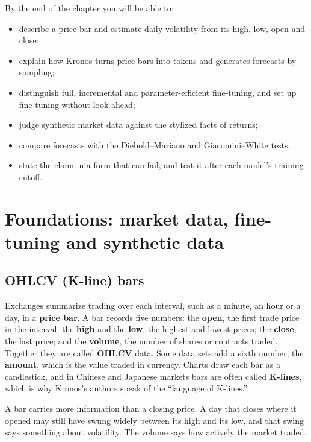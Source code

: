 By the end of the chapter you will be able to:

\begin{itemize}
  \item describe a price bar and estimate daily volatility from its high, low, open and close;
  \item explain how Kronos turns price bars into tokens and generates forecasts by sampling;
  \item distinguish full, incremental and parameter-efficient fine-tuning, and set up fine-tuning without look-ahead;
  \item judge synthetic market data against the stylized facts of returns;
  \item compare forecasts with the Diebold--Mariano and Giacomini--White tests;
  \item state the claim in a form that can fail, and test it after each model's training cutoff.
\end{itemize}

\section{Foundations: market data, fine-tuning and synthetic data}
\label{sec:22-foundations}

\subsection{OHLCV (K-line) bars}

Exchanges summarize trading over each interval, such as a minute, an hour or a day, in a \textbf{price bar}. A bar records five numbers: the \textbf{open}, the first trade price in the interval; the \textbf{high} and the \textbf{low}, the highest and lowest prices; the \textbf{close}, the last price; and the \textbf{volume}, the number of shares or contracts traded. Together they are called \textbf{OHLCV} data. Some data sets add a sixth number, the \textbf{amount}, which is the value traded in currency. Charts draw each bar as a candlestick, and in Chinese and Japanese markets bars are often called \textbf{K-lines}, which is why Kronos's authors speak of the ``language of K-lines.''

A bar carries more information than a closing price. A day that closes where it opened may still have swung widely between its high and its low, and that swing says something about volatility. The volume says how actively the market traded.

